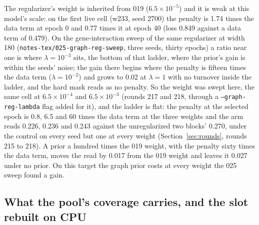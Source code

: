 The regularizer's weight is inherited from 019 ($6.5 \times 10^{-5}$) and it is weak at
this model's scale: on the first live cell (w233, seed 2700) the penalty is 1.74 times
the data term at epoch 0 and 0.77 times it at epoch 40 (loss 0.849 against a data term
of 0.479). On the gene-interaction sweep of the same regularizer at width 180
(\texttt{notes-tex/025-graph-reg-sweep}, three seeds, thirty epochs) a ratio near one
is where $\lambda = 10^{-3}$ sits, the bottom of that ladder, where the prior's gain is
within the seeds' noise; the gain there begins where the penalty is fifteen times the
data term ($\lambda = 10^{-2}$) and grows to 0.02 at $\lambda = 1$ with no turnover
inside the ladder, and the hard mask reads as no penalty. So the weight was swept here,
the same cell at $6.5 \times 10^{-4}$ and $6.5 \times 10^{-3}$ (rounds 217 and 218,
through a \texttt{--graph-reg-lambda} flag added for it), and the ladder is flat: the
penalty at the selected epoch is 0.8, 6.5 and 60 times the data term at the three
weights and the arm reads 0.226, 0.236 and 0.243 against the unregularized two blocks'
0.270, under the control on every seed but one at every weight
(Section~\ref{sec:rounds}, rounds 215 to 218). A prior a hundred times the 019 weight,
with the penalty sixty times the data term, moves the read by 0.017 from the 019
weight and leaves it 0.027 under no prior. On this target the graph prior costs at every
weight the 025 sweep found a gain.



\subsection{What the pool's coverage carries, and the slot rebuilt on CPU}
\label{sec:coverage}

